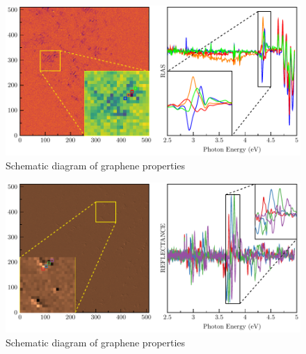 \begin{figure}
	\centering
	\includegraphics[width=0.8\linewidth]{FIGURES/Anexo-CuSn/2slmpp-ras-0.pdf}
	\caption{Schematic diagram of graphene properties}
	\label{fig:introfig32}
\end{figure}

\begin{figure}
	\centering
	\includegraphics[width=0.8\linewidth]{FIGURES/Anexo-CuSn/2slmpp-ras-1.pdf}
	\caption{Schematic diagram of graphene properties}
	\label{fig:introfig32}
\end{figure}